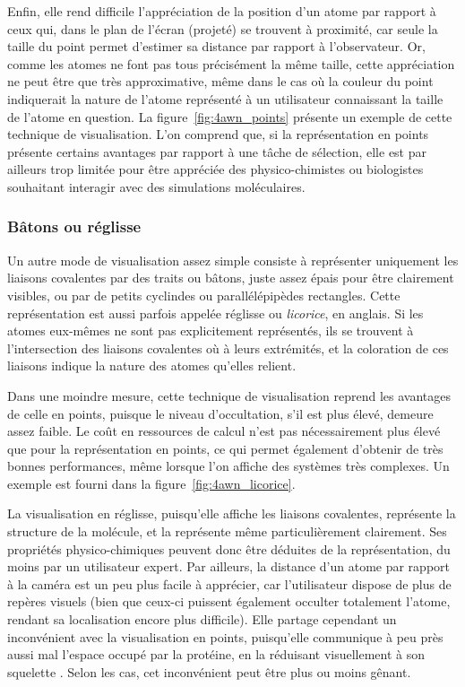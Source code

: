 	Enfin, elle rend difficile l'appréciation de la position d'un atome par rapport à ceux qui, dans le plan de l'écran (projeté) se trouvent à proximité, car seule la taille du point permet d'estimer sa distance par rapport à l'observateur. Or, comme les atomes ne font pas tous précisément la même taille, cette appréciation ne peut être que très approximative, même dans le cas où la couleur du point indiquerait la nature de l'atome représenté à un utilisateur connaissant la taille de l'atome en question. La figure~\ref{fig:4awn_points} présente un exemple de cette technique de visualisation. L'on comprend que, si la représentation en points présente certains avantages par rapport à une tâche de sélection, elle est par ailleurs trop limitée pour être appréciée des physico-chimistes ou biologistes souhaitant interagir avec des simulations moléculaires.
	    
	\subsubsection{Bâtons ou réglisse} Un autre mode de visualisation assez simple consiste à représenter uniquement les liaisons covalentes par des traits ou bâtons, juste assez épais pour être clairement visibles, ou par de petits cyclindes ou parallélépipèdes rectangles. Cette représentation est aussi parfois appelée \og réglisse \fg{} ou \emph{licorice}, en anglais. Si les atomes eux-mêmes ne sont pas explicitement représentés, ils se trouvent à l'intersection des liaisons covalentes où à leurs extrémités, et la coloration de ces liaisons indique la nature des atomes qu'elles relient.
		
	Dans une moindre mesure, cette technique de visualisation reprend les avantages de celle en points, puisque le niveau d'occultation, s'il est plus élevé, demeure assez faible. Le coût en ressources de calcul n'est pas nécessairement plus élevé que pour la représentation en points, ce qui permet également d'obtenir de très bonnes performances, même lorsque l'on affiche des systèmes très complexes. Un exemple est fourni dans la figure~\ref{fig:4awn_licorice}.
		
	La visualisation en réglisse, puisqu'elle affiche les liaisons covalentes, représente la structure de la molécule, et la représente même particulièrement clairement. Ses propriétés physico-chimiques peuvent donc être déduites de la représentation, du moins par un utilisateur expert. Par ailleurs, la distance d'un atome par rapport à la caméra est un peu plus facile à apprécier, car l'utilisateur dispose de plus de repères visuels (bien que ceux-ci puissent également occulter totalement l'atome, rendant sa localisation encore plus difficile). Elle partage cependant un inconvénient avec la visualisation en points, puisqu'elle communique à peu près aussi mal l'espace occupé par la protéine, en la réduisant visuellement à son \og squelette \fg{}. Selon les cas, cet inconvénient peut être plus ou moins gênant.
		
